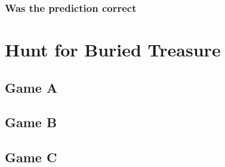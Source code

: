 \documentclass[11pt, letterpaper, includehead]{article}
\begin{document}
\subsubsection{Was the prediction correct} %

\section{Hunt for Buried Treasure} %
\subsection{Game A} %
\subsection{Game B} %
\subsection{Game C} %
\end{document}
